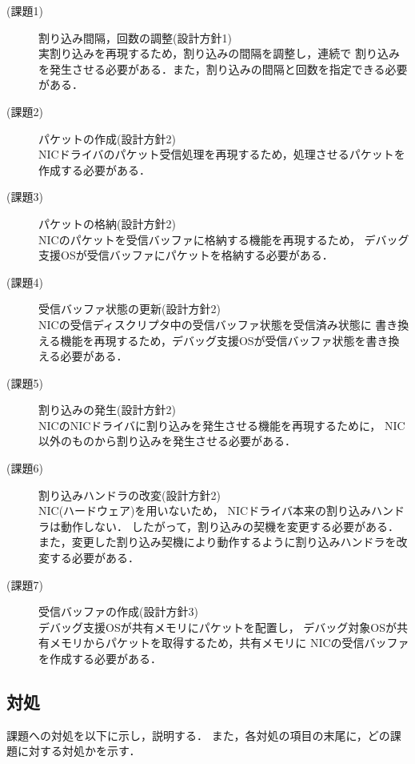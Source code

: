 \documentclass[submit,techreq,noauthor,dvipdfmx]{ipsj}
\begin{document}
\begin{description}
    \item[(課題1)] 割り込み間隔，回数の調整(設計方針1)\\
        実割り込みを再現するため，割り込みの間隔を調整し，連続で
        割り込みを発生させる必要がある．また，割り込みの間隔と回数を指定できる必要がある．
    \item[(課題2)] パケットの作成(設計方針2)\\
        NICドライバのパケット受信処理を再現するため，処理させるパケットを
        作成する必要がある．
    \item[(課題3)] パケットの格納(設計方針2)\\
        NICのパケットを受信バッファに格納する機能を再現するため，
        デバッグ支援OSが受信バッファにパケットを格納する必要がある．
    \item[(課題4)] 受信バッファ状態の更新(設計方針2)\\
        NICの受信ディスクリプタ中の受信バッファ状態を受信済み状態に
        書き換える機能を再現するため，デバッグ支援OSが受信バッファ状態を書き換える必要がある．
    \item[(課題5)] 割り込みの発生(設計方針2)\\
        NICのNICドライバに割り込みを発生させる機能を再現するために，
        NIC以外のものから割り込みを発生させる必要がある．
    \item[(課題6)] 割り込みハンドラの改変(設計方針2)\\
        NIC(ハードウェア)を用いないため，
        NICドライバ本来の割り込みハンドラは動作しない．
        したがって，割り込みの契機を変更する必要がある．
        また，変更した割り込み契機により動作するように割り込みハンドラを改変する必要がある．
    \item[(課題7)] 受信バッファの作成(設計方針3)\\
        デバッグ支援OSが共有メモリにパケットを配置し，
        デバッグ対象OSが共有メモリからパケットを取得するため，共有メモリに
        NICの受信バッファを作成する必要がある．
\end{description}

\subsection{対処}\label{sec:deal}

課題への対処を以下に示し，説明する．
また，各対処の項目の末尾に，どの課題に対する対処かを示す．
\end{document}
